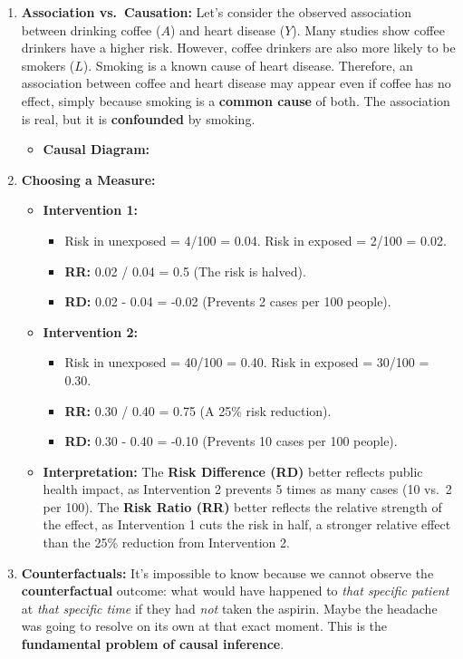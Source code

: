 \documentclass[
  10pt,
  letterpaper,
  DIV=11,
  numbers=noendperiod]{scrartcl}
\providecommand{\tightlist}{%
  \setlength{\itemsep}{0pt}\setlength{\parskip}{0pt}}
\begin{document}
\begin{enumerate}
\def\labelenumi{\arabic{enumi}.}
\item
  \textbf{Association vs.~Causation:} Let's consider the observed
  association between drinking coffee (\(A\)) and heart disease (\(Y\)).
  Many studies show coffee drinkers have a higher risk. However, coffee
  drinkers are also more likely to be smokers (\(L\)). Smoking is a
  known cause of heart disease. Therefore, an association between coffee
  and heart disease may appear even if coffee has no effect, simply
  because smoking is a \textbf{common cause} of both. The association is
  real, but it is \textbf{confounded} by smoking.

  \begin{itemize}
  \tightlist
  \item
    \textbf{Causal Diagram:}
  \end{itemize}
\item
  \textbf{Choosing a Measure:}

  \begin{itemize}
  \tightlist
  \item
    \textbf{Intervention 1:}

    \begin{itemize}
    \tightlist
    \item
      Risk in unexposed = 4/100 = 0.04. Risk in exposed = 2/100 = 0.02.
    \item
      \textbf{RR:} 0.02 / 0.04 = 0.5 (The risk is halved).
    \item
      \textbf{RD:} 0.02 - 0.04 = -0.02 (Prevents 2 cases per 100
      people).
    \end{itemize}
  \item
    \textbf{Intervention 2:}

    \begin{itemize}
    \tightlist
    \item
      Risk in unexposed = 40/100 = 0.40. Risk in exposed = 30/100 =
      0.30.
    \item
      \textbf{RR:} 0.30 / 0.40 = 0.75 (A 25\% risk reduction).
    \item
      \textbf{RD:} 0.30 - 0.40 = -0.10 (Prevents 10 cases per 100
      people).
    \end{itemize}
  \item
    \textbf{Interpretation:} The \textbf{Risk Difference (RD)} better
    reflects public health impact, as Intervention 2 prevents 5 times as
    many cases (10 vs.~2 per 100). The \textbf{Risk Ratio (RR)} better
    reflects the relative strength of the effect, as Intervention 1 cuts
    the risk in half, a stronger relative effect than the 25\% reduction
    from Intervention 2.
  \end{itemize}
\item
  \textbf{Counterfactuals:} It's impossible to know because we cannot
  observe the \textbf{counterfactual} outcome: what would have happened
  to \emph{that specific patient} at \emph{that specific time} if they
  had \emph{not} taken the aspirin. Maybe the headache was going to
  resolve on its own at that exact moment. This is the
  \textbf{fundamental problem of causal inference}.
\end{enumerate}
\end{document}
